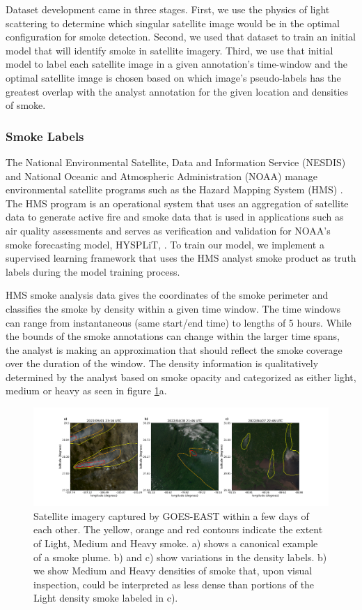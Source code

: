 \documentclass{ametsocV6.1}
\begin{document}
Dataset development came in three stages. First, we use the physics of light scattering to determine which singular satellite image would be in the optimal configuration for smoke detection. Second, we used that dataset to train an initial model that will identify smoke in satellite imagery. Third, we use that initial model to label each satellite image in a given annotation's time-window and the optimal satellite image is chosen based on which image's pseudo-labels has the greatest overlap with the analyst annotation for the given location and densities of smoke.

\subsubsection*{Smoke Labels} 
The National Environmental Satellite, Data and Information Service (NESDIS) and National Oceanic and Atmospheric Administration (NOAA) manage environmental satellite programs such as the Hazard Mapping System (HMS) \citep{hms, hms_val}. The HMS program is an operational system that uses an aggregation of satellite data to generate active fire and smoke data that is used in applications such as air quality assessments and serves as verification and validation for NOAA's smoke forecasting model, HYSPLiT, \citep{hysplit_ver}. To train our model, we implement a supervised learning framework that uses the HMS analyst smoke product as truth labels during the model training process.

HMS smoke analysis data gives the coordinates of the smoke perimeter and classifies the smoke by density within a given time window. The time windows can range from instantaneous (same start/end time) to lengths of 5 hours. While the bounds of the smoke annotations can change within the larger time spans, the analyst is making an approximation that should reflect the smoke coverage over the duration of the window. The density information is qualitatively determined by the analyst based on smoke opacity and categorized as either light, medium or heavy as seen in figure \ref{densities}a.

\begin{figure}
    \centering
    \includegraphics[width=15cm]{figures/Misclassified.png}
    \caption{Satellite imagery captured by GOES-EAST within a few days of each other. The yellow, orange and red contours indicate the extent of Light, Medium and Heavy smoke.  a) shows a canonical example of a smoke plume. b) and c) show variations in the density labels. b) we show Medium and Heavy densities of smoke that, upon visual inspection, could be interpreted as less dense than portions of the Light density smoke labeled in c).}\label{densities}
\end{figure}
\end{document}
